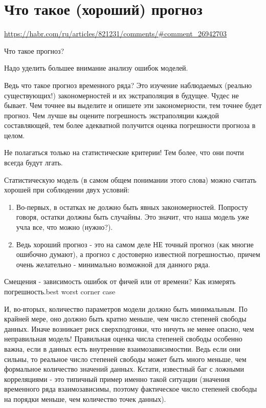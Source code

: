 \section{Что такое (хороший) прогноз}

\url{https://habr.com/ru/articles/821231/comments/#comment_26942703}

Что такое прогноз?

Надо уделить большее внимание анализу ошибок моделей.

Ведь что такое прогноз временного ряда? Это изучение наблюдаемых
(реально существующих!) закономерностей и их экстраполяция в будущее.
Чудес не бывает. Чем точнее вы выделите и опишете эти закономерности,
тем точнее будет прогноз. Чем лучше вы оцените погрешность
экстраполяции каждой составляющей, тем более адекватной получится
оценка погрешности прогноза в целом.

Не полагаться только на статистические критерии! Тем более, что они
почти всегда будут лгать.

Статистическую модель (в самом общем понимании этого слова) можно
считать хорошей при соблюдении двух условий:

\begin{enumerate}
  \item Во-первых, в остатках не должно быть явных закономерностей. Попросту
    говоря, остатки должны быть случайны. Это значит, что наша модель уже
    учла все, что можно (нужно?).
  \item Ведь хороший прогноз - это на самом деле НЕ точный прогноз
    (как многие ошибочно думают), а прогноз с достоверно известной
    погрешностью, причем очень желательно - минимально возможной для
    данного ряда.
\end{enumerate}

Смещения - зависимость ошибок от фичей или от времени?
Как измерять погрешность.best worst corner case

И, во-вторых, количество параметров модели должно быть минимальным.
По крайней мере, оно должно быть кратно меньше, чем число степеней
свободы данных. Иначе возникает риск сверхподгонки, что ничуть не
менее опасно, чем неправильная модель! Правильная оценка числа
степеней свободы особенно важна, если в данных есть внутренние
взаимозависимостии. Ведь если они сильны, то реальное число степеней
свободы может быть много меньше, чем формальное количество значений
данных. Кстати, известный баг с ложными корреляциями - это типичный
пример именно такой ситуации (значения временного ряда
  взаимозависимы, поэтому фактическое число степеней свободы на порядки
меньше, чем количество точек данных).